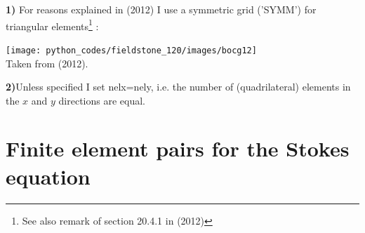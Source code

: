 \begin{remark}
{\bf 1)} For reasons explained in \textcite{bocg12} (2012) I use 
a symmetric grid ('SYMM') for triangular elements\footnote{See also remark 
of section 20.4.1 in \textcite{tesk12} (2012)} :
\begin{center} 
\texttt{[image: python\_codes/fieldstone\_120/images/bocg12]}\\
{\captionfont Taken from \textcite{bocg12} (2012).}
\end{center} 
\end{remark}

\begin{remark}
{\bf 2)}Unless specified I set nelx=nely, i.e. the number of (quadrilateral) elements
in the $x$ and $y$ directions are equal.
\end{remark}

\section*{Finite element pairs for the Stokes equation}

